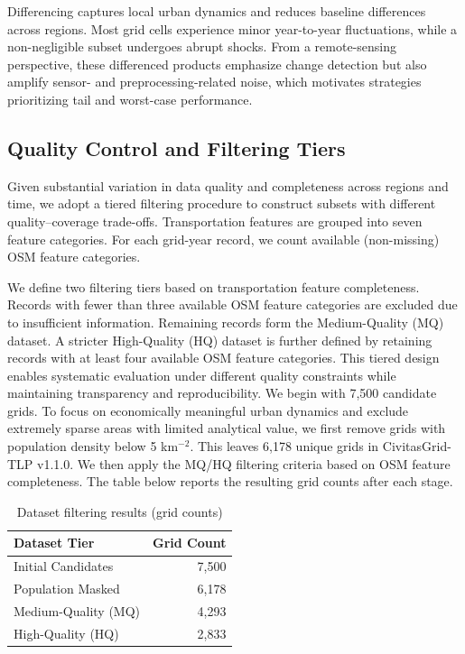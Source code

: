 \documentclass[preprint,12pt]{elsarticle}
\begin{document}
Differencing captures local urban dynamics and reduces baseline differences across regions. Most grid cells experience minor year-to-year fluctuations, while a non-negligible subset undergoes abrupt shocks. From a remote-sensing perspective, these differenced products emphasize change detection but also amplify sensor- and preprocessing-related noise, which motivates strategies prioritizing tail and worst-case performance.

\subsection{Quality Control and Filtering Tiers}

Given substantial variation in data quality and completeness across regions and time, we adopt a tiered filtering procedure to construct subsets with different quality–coverage trade-offs. Transportation features are grouped into seven feature categories. For each grid-year record, we count available (non-missing) OSM feature categories.

We define two filtering tiers based on transportation feature completeness. Records with fewer than three available OSM feature categories are excluded due to insufficient information. Remaining records form the Medium-Quality (MQ) dataset. A stricter High-Quality (HQ) dataset is further defined by retaining records with at least four available OSM feature categories. This tiered design enables systematic evaluation under different quality constraints while maintaining transparency and reproducibility. We begin with 7,500 candidate grids. To focus on economically meaningful urban dynamics and exclude extremely sparse areas with limited analytical value, we first remove grids with population density below 5 km$^{-2}$. This leaves 6,178 unique grids in CivitasGrid-TLP v1.1.0. We then apply the MQ/HQ filtering criteria based on OSM feature completeness. The table below reports the resulting grid counts after each stage.
\begin{table}[htbp]
    \centering
    \begin{tabular}{lr}
        \toprule
        \textbf{Dataset Tier} & \textbf{Grid Count}\\
        \midrule
        Initial Candidates & 7,500 \\
        Population Masked & 6,178 \\
        Medium-Quality (MQ) & 4,293 \\
        High-Quality (HQ) & 2,833 \\
        \bottomrule
    \end{tabular}
    \caption{Dataset filtering results (grid counts)}
    \label{tab:filtering}

\end{table}
\end{document}
